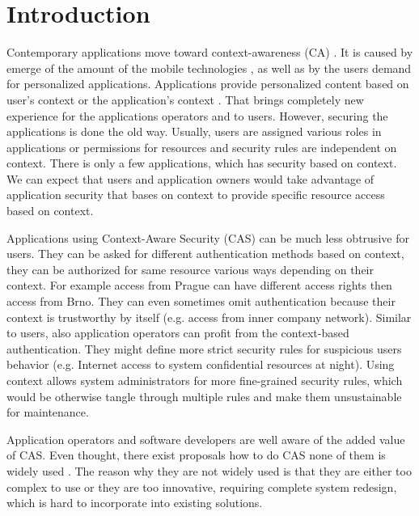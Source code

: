 \documentclass{poster15}
\begin{document}

\section{Introduction}

Contemporary applications move toward context-awareness (CA) \cite{context,tomas1}. It is caused by emerge of the amount of the mobile technologies \cite{mobilecontext}, as well as by the users demand for personalized applications. Applications provide personalized content based on user's context or the application's context \cite{personalizedcontext}. That brings completely new experience for the applications operators and to users. However, securing the applications is done the old way. Usually, users are assigned various roles in applications or permissions for resources and security rules are independent on context. There is only a few applications, which has security based on context. We can expect that users and application owners would take advantage of application security that bases on context to provide specific resource access based on context.

Applications using Context-Aware Security (CAS) can be much less obtrusive for users. They can be asked for different authentication methods based on context, they can be authorized for same resource various ways depending on their context. For example access from Prague can have different access rights then access from Brno. They can even sometimes omit authentication because their context is trustworthy by itself (e.g. access from inner company network). Similar to users, also application operators can profit from the context-based authentication. They might define more strict security rules for suspicious users behavior (e.g. Internet access to system confidential resources at night). Using context allows system administrators for more fine-grained security rules, which would be otherwise tangle through multiple rules and make them unsustainable for maintenance. 

Application operators and software developers are well aware of the added value of CAS. Even thought, there exist proposals how to do CAS none of them is widely used \cite{grbac,envroles,contextroles,contextaccess,contextawarerbac,xorbac,genericcontext,ubiscom,hung,wendong}. The reason why they are not widely used is that they are either too complex to use or they are too innovative, requiring complete system redesign, which is hard to incorporate into existing solutions.
\end{document}
